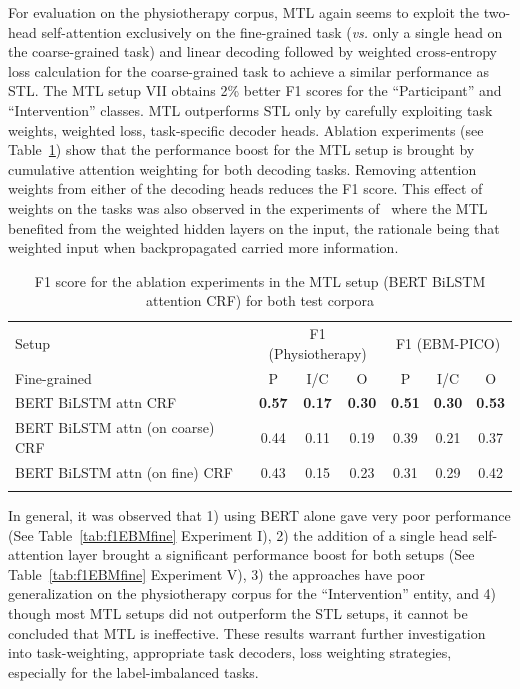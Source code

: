 \documentclass[runningheads]{llncs}
\begin{document}
For evaluation on the physiotherapy corpus, MTL again seems to exploit the two-head self-attention exclusively on the fine-grained task (\textit{vs.} only a single head on the coarse-grained task) and linear decoding followed by weighted cross-entropy loss calculation for the coarse-grained task to achieve a similar performance as STL.
The MTL setup VII obtains 2\% better F1 scores for the ``Participant'' and ``Intervention'' classes.
MTL outperforms STL only by carefully exploiting task weights, weighted loss, task-specific decoder heads.
Ablation experiments (see Table~\ref{table:ablation}) show that the performance boost for the MTL setup is brought by cumulative attention weighting for both decoding tasks.
Removing attention weights from either of the decoding heads reduces the F1 score.
This effect of weights on the tasks was also observed in the experiments of~\cite{caruana1997multitask} where the MTL benefited from the weighted hidden layers on the input, the rationale being that weighted input when backpropagated carried more information.
%
\begingroup
\setlength{\tabcolsep}{5.5pt} %
\renewcommand{\arraystretch}{1.0}
\begin{table}[h!]
    \centering
    \caption{F1 score for the ablation experiments in the MTL setup (BERT BiLSTM attention CRF) for both test corpora}
    \label{table:ablation}
    \begin{tabular}{lcccccc}
        \Xhline{1pt}
        Setup & \multicolumn{3}{c}{ F1 (Physiotherapy)}  & \multicolumn{3}{c}{ F1 (EBM-PICO)} \\
        \Xhline{1pt}
        Fine-grained & P & I/C & O & P & I/C & O \\
        \Xhline{1pt}
        BERT BiLSTM attn CRF & \textbf{0.57} & \textbf{0.17} & \textbf{0.30} & \textbf{0.51} & \textbf{0.30} & \textbf{0.53} \\
        BERT BiLSTM attn (on coarse) CRF & 0.44 & 0.11 & 0.19 & 0.39 & 0.21 & 0.37 \\
        BERT BiLSTM attn (on fine) CRF & 0.43 & 0.15 & 0.23 & 0.31 & 0.29 & 0.42 \\
        \Xhline{1pt}
    \end{tabular}
\end{table}
\endgroup

In general, it was observed that 1) using BERT alone gave very poor performance (See Table~\ref{tab:f1EBMfine} Experiment I), 2) the addition of a single head self-attention layer brought a significant performance boost for both setups (See Table~\ref{tab:f1EBMfine} Experiment V), 3) the approaches have poor generalization on the physiotherapy corpus for the ``Intervention'' entity, and 4) though most MTL setups did not outperform the STL setups, it cannot be concluded that MTL is ineffective. 
These results warrant further investigation into task-weighting, appropriate task decoders, loss weighting strategies, especially for the label-imbalanced tasks.
%
\end{document}
